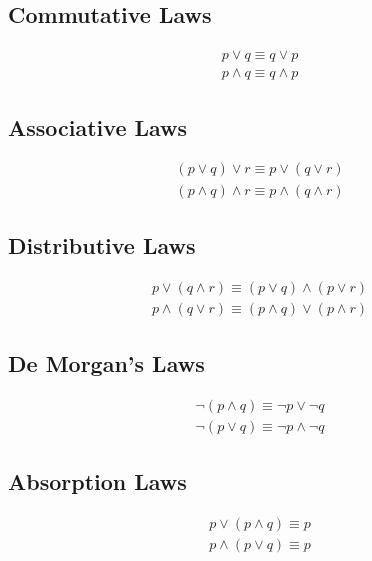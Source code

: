 \documentclass[12pt letter]{report}
\begin{document}
\subsection{Commutative Laws}

\begin{align*}
	p \vee q \equiv q \vee p \\
	p \wedge q \equiv q \wedge p
\end{align*}

\subsection{Associative Laws}

\begin{align*}
	\left( p \vee q \right)  \vee  r \equiv p \vee \left( q \vee r \right) \\
	\left( p \wedge q \right) \wedge  r \equiv p \wedge \left( q \wedge r \right)
\end{align*}

\subsection{Distributive Laws}

\begin{align*}
	p \vee \left( q \wedge r \right) \equiv \left( p \vee q \right)  \wedge \left( p \vee r \right) \\
	p \wedge \left( q \vee r  \right)  \equiv \left( p \wedge q  \right) \vee \left( p \wedge r \right)
\end{align*}

\subsection{De Morgan's Laws}

\begin{align*}
	\neg \left( p \wedge q \right) \equiv \neg p \vee \neg  q \\
	\neg \left( p \vee q  \right) \equiv \neg p \wedge \neg q
\end{align*}

\subsection{Absorption Laws}

\begin{align*}
	p \vee \left( p \wedge q  \right)  \equiv p \\
	p \wedge \left( p \vee q  \right) \equiv p
\end{align*}
\end{document}

